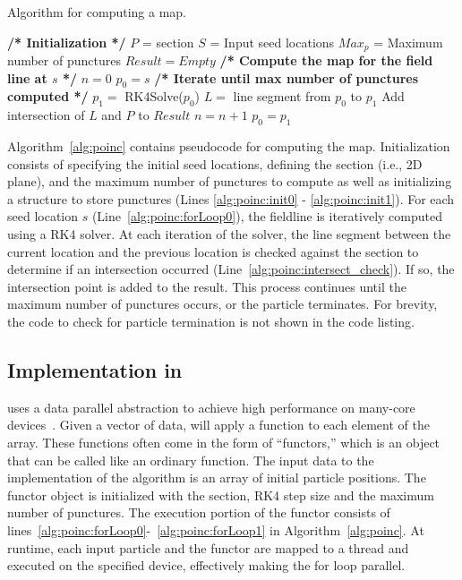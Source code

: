 \begin{algorithm}
\caption{Algorithm for computing a \poincare map.}
\label{alg:poinc}

\begin{algorithmic}[1]
\State \textbf{/* Initialization */}
\State $P$ = \poincare section \label{alg:poinc:init0}
\State $S$ = Input seed locations
\State $Max_p$ = Maximum number of punctures
\State $Result = Empty$ \label{alg:poinc:init1}
\State 
{} \label{alg:poinc:forLoop0}
  \State \textbf{/* Compute the \poincare map for the field line at $s$ */}
  \State $n = 0$ %
  \State $p_0 = s$ 
  \State
  \State \textbf{/* Iterate until max number of punctures computed */}
    \label{alg:poinc:whileLoop0}
    \State $p_1 = $ RK4Solve($p_0$)
    \State $L = $ line segment from $p_0$ to $p_1$
     \label{alg:poinc:intersect_check}
      \State Add intersection of $L$ and $P$ to $Result$
      \State $n = n + 1$
     \EndIf
    \State $p_0 = p_1$
   \EndWhile  \label{alg:poinc:whileLoop1}
\EndFor   \label{alg:poinc:forLoop1}

\end{algorithmic}
\end{algorithm}


Algorithm~\ref{alg:poinc} contains pseudocode for computing the \poincare map.
Initialization consists of specifying the initial seed locations, defining the \poincare section (i.e., 2D plane), and the maximum number of punctures to compute as well as initializing a structure to store punctures (Lines \ref{alg:poinc:init0} - \ref{alg:poinc:init1}).
For each seed location $s$ (Line~\ref{alg:poinc:forLoop0}), the fieldline is iteratively computed using a RK4 solver. At each iteration of the solver, the line segment between the current location and the previous location is checked against the \poincare section to determine if an intersection occurred (Line~\ref{alg:poinc:intersect_check}).
If so, the intersection point is added to the result.
This process continues until the maximum number of punctures occurs, or the particle terminates. For brevity, the code to check for particle termination is not shown in the code listing.

\subsection{Implementation in \vtkm}
\vtkm uses a data parallel abstraction to achieve high performance on many-core devices~\cite{MCD3:2021}.
Given a vector of data, \vtkm will apply a function to each element of the array. These functions often come in the form of ``functors,'' which is an object that can be called like an ordinary function. 
The input data to the \vtkm implementation of the \poincare algorithm is an array of initial particle positions. 
The functor object is initialized with the \poincare section, RK4 step size and the maximum number of punctures.
The execution portion of the functor consists of lines~\ref{alg:poinc:forLoop0}-~\ref{alg:poinc:forLoop1} in Algorithm~\ref{alg:poinc}.
At runtime, each input particle and the functor are mapped to a thread and executed on the specified device, effectively making the for loop parallel.

